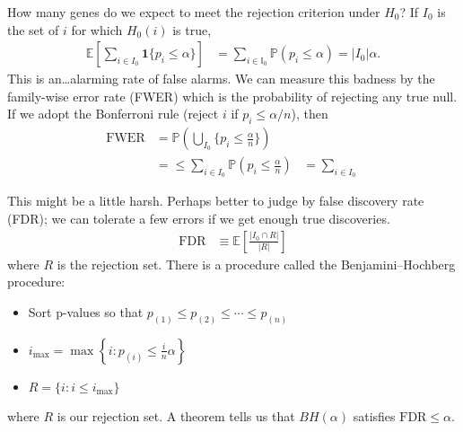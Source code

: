 \documentclass[11pt,letterpaper]{article}
\theoremstyle{definition}
\theoremstyle{plain}
\numberwithin{equation}{section}
\numberwithin{figure}{section}
\begin{document}
How many genes do we expect to meet the rejection criterion under $H_0$? If $I_0$ is the set of $i$ for which $H_0(i)$ is true,
%
\begin{align}
	\mathbb{E}\left[\sum_{i\in I_0} \bm{1}\{p_i \leq \alpha\}\right] &= \sum_{i \in \mathbb{I}_0} \mathbb{P}(p_i \leq \alpha) = |I_0| \alpha.
\end{align}
%
This is an\ldots alarming rate of false alarms. We can measure this badness by the family-wise error rate (FWER) which is the probability of rejecting any true null. If we adopt the Bonferroni rule (reject $i$ if $p_i \leq \alpha/n$), then
%
\begin{align}
	\mathrm{FWER} &= \mathbb{P}\left(\bigcup_{I_0} \{p_i \leq \frac{\alpha}{n}\}\right)\\
	&= \leq \sum_{i \in I_0} \mathbb{P}\left(p_i \leq \frac{\alpha}{n}\right)
	&= \sum_{i \in I_0} \frac{}{}
\end{align}




This might be a little harsh. Perhaps better to judge by false discovery rate (FDR); we can tolerate a few errors if we get enough true discoveries.
%
\begin{align}
	\mathrm{FDR} &\equiv \mathbb{E}\left[\frac{|I_0 \cap R|}{|R|}\right]
\end{align}
%
where $R$ is the rejection set. There is a procedure called the Benjamini--Hochberg procedure:
%
\begin{itemize}
	\item Sort p-values so that $p_{(1)} \leq p_{(2)} \leq \cdots \leq p_{(n)}$
	\item $i_\mathrm{max} = \max\left\{i : p_{(i)} \leq \frac{i}{n} \alpha\right\}$
	\item $R = \{i: i \leq i_\mathrm{max}\}$
\end{itemize}
%
where $R$ is our rejection set. A theorem tells us that $BH(\alpha)$ satisfies $\mathrm{FDR} \leq \alpha$.
\end{document}
